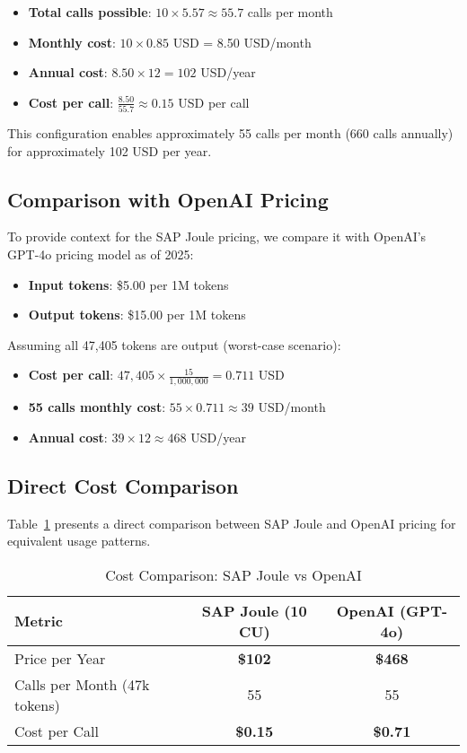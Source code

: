 \begin{itemize}
    \item \textbf{Total calls possible}: $10 \times 5.57 \approx 55.7$ calls per month
    \item \textbf{Monthly cost}: $10 \times 0.85$ USD = 8.50 USD/month
    \item \textbf{Annual cost}: $8.50 \times 12 = 102$ USD/year
    \item \textbf{Cost per call}: $\frac{8.50}{55.7} \approx 0.15$ USD per call
\end{itemize}

This configuration enables approximately 55 calls per month (660 calls annually) for approximately 102 USD per year.

\subsection{Comparison with OpenAI Pricing}

To provide context for the SAP Joule pricing, we compare it with OpenAI's GPT-4o pricing model as of 2025:

\begin{itemize}
    \item \textbf{Input tokens}: \$5.00 per 1M tokens
    \item \textbf{Output tokens}: \$15.00 per 1M tokens
\end{itemize}

Assuming all 47,405 tokens are output (worst-case scenario):

\begin{itemize}
    \item \textbf{Cost per call}: $47,405 \times \frac{15}{1,000,000} = 0.711$ USD
    \item \textbf{55 calls monthly cost}: $55 \times 0.711 \approx 39$ USD/month
    \item \textbf{Annual cost}: $39 \times 12 \approx 468$ USD/year
\end{itemize}

\subsection{Direct Cost Comparison}

Table~\ref{tab:cost_comparison} presents a direct comparison between SAP Joule and OpenAI pricing for equivalent usage patterns.

\begin{table}[h]
\centering
\caption{Cost Comparison: SAP Joule vs OpenAI}
\label{tab:cost_comparison}
\begin{tabular}{|l|c|c|}
\hline
\textbf{Metric} & \textbf{SAP Joule (10 CU)} & \textbf{OpenAI (GPT-4o)} \\
\hline
Price per Year & \textbf{\$102} & \textbf{\$468} \\
Calls per Month (47k tokens) & 55 & 55 \\
Cost per Call & \textbf{\$0.15} & \textbf{\$0.71} \\
\hline
\end{tabular}
\end{table}


